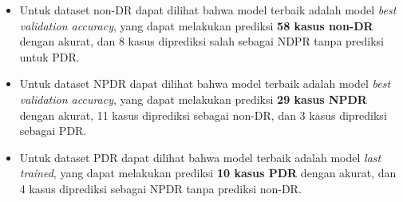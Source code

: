 \begin{itemize}
	\item Untuk dataset non-DR dapat dilihat bahwa model terbaik adalah model \emph{best validation accuracy}, yang dapat melakukan prediksi \textbf{58 kasus non-DR} dengan akurat, dan 8 kasus diprediksi salah sebagai NDPR tanpa prediksi untuk PDR.
	
	\item Untuk dataset NPDR dapat dilihat bahwa model terbaik adalah model \emph{best validation accuracy}, yang dapat melakukan prediksi \textbf{29 kasus NPDR} dengan akurat, 11 kasus diprediksi sebagai non-DR, dan 3 kasus diprediksi sebagai PDR.
	
	\item Untuk dataset PDR dapat dilihat bahwa model terbaik adalah model \emph{last trained}, yang dapat melakukan prediksi \textbf{10 kasus PDR} dengan akurat, dan 4 kasus diprediksi sebagai NPDR tanpa prediksi non-DR.
\end{itemize}
\pagebreak


